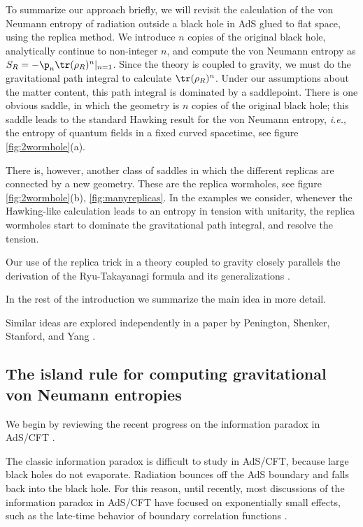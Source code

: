 To summarize our approach briefly, we will revisit the calculation of the von Neumann entropy of radiation outside a black hole in AdS glued to flat space, using the replica method. We introduce $n$ copies of the original black hole, analytically continue to non-integer $n$, and compute the von Neumann entropy as $S_R = - \p_n \tr (\rho_R)^n|_{n = 1}$. Since the theory is coupled to gravity, we must do the gravitational path integral  to calculate $\tr (\rho_R)^n$. Under our assumptions about the matter content, this path integral is dominated by a saddlepoint. There is one obvious saddle, in which the geometry is $n$ copies of the original black hole; this saddle leads to the standard Hawking result for the von Neumann entropy, \textit{i.e.}, the entropy of quantum fields in a fixed curved spacetime, see figure \ref{fig:2wormhole}(a).

 

 
 There is, however, another class of saddles in which the different replicas are connected by a new geometry. These are the replica wormholes, see figure \ref{fig:2wormhole}(b), \ref{fig:manyreplicas}. In the examples we consider, whenever the Hawking-like calculation leads to an entropy in tension with unitarity, the replica wormholes start to dominate the gravitational path integral, and resolve the tension.

 
Our use of the replica trick in a theory coupled to gravity closely parallels the derivation of   the Ryu-Takayanagi formula  and its generalizations \cite{Lewkowycz:2013nqa,Faulkner:2013ana,Dong:2016hjy,Dong:2017xht}.

In the rest of the introduction we summarize the main idea in more detail.

Similar ideas are explored independently in a paper by Penington, Shenker, Stanford, and Yang \cite{Penington:2019kki}.

\subsection{The island rule for computing gravitational von Neumann entropies}

We begin by reviewing the recent progress on the information paradox in AdS/CFT  \cite{Penington:2019npb,Almheiri:2019psf}.

The classic information paradox is difficult to study in AdS/CFT, because large black holes do not evaporate. Radiation bounces off the AdS boundary and falls back into the black hole.  For this reason, until recently, most discussions of the information paradox in AdS/CFT have focused on exponentially small effects, such as the late-time behavior of boundary correlation functions \cite{Maldacena:2001kr,Saad:2018bqo,Saad:2019lba,Saad:2019pqd}.

